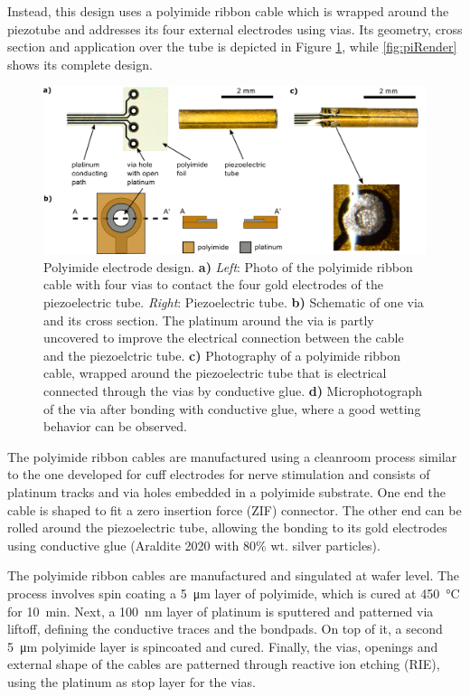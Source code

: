 \documentclass[10pt]{iopart}
\begin{document}
Instead, this design uses a polyimide ribbon cable which is wrapped around the piezotube and addresses its four external electrodes using vias. Its geometry, cross section and application over the tube is depicted in Figure \ref{fig:piRolled}, while \autoref{fig:piRender} shows its complete design.

\begin{figure}[h!]\centering \includegraphics[width=\columnwidth]{figures/tubeFoilH.png}
      \caption{Polyimide electrode design.
      \textbf{a)} \textit{Left}: Photo of the polyimide ribbon cable with four vias to contact the four gold electrodes of the piezoelectric tube. \textit{Right}: Piezoelectric tube.
      \textbf{b)} Schematic of one via and its cross section. The platinum around the via is partly uncovered to improve the electrical connection between the cable and the piezoelctric tube.
      \textbf{c)} Photography of a polyimide ribbon cable, wrapped around the piezoelectric tube that is electrical connected through the vias by conductive glue.
      \textbf{d)} Microphotograph of the via after bonding with conductive glue, where a good wetting behavior can be observed.}
      \label{fig:piRolled}
\end{figure}

The polyimide ribbon cables are manufactured using a cleanroom process similar to the one developed for cuff electrodes for nerve stimulation \cite{Rodriguez2000} and consists of platinum tracks and via holes embedded in a polyimide substrate. One end the cable is shaped to fit a zero insertion force (ZIF) connector. The other end can be rolled around the piezoelectric tube, allowing the bonding to its gold electrodes using conductive glue (Araldite 2020 with 80\% wt. silver particles).

The polyimide ribbon cables are manufactured and singulated at wafer level. The process involves spin coating a \SI{5}{\micro\meter} layer of polyimide, which is cured at \SI{450}{\celsius} for \SI{10}{\minute}. Next, a \SI{100}{\nano\meter} layer of platinum is sputtered and patterned via liftoff, defining the conductive traces and the bondpads. On top of it, a second \SI{5}{\micro\meter} polyimide layer is spincoated and cured. Finally, the vias, openings and external shape of the cables are patterned through reactive ion etching (RIE), using the platinum as stop layer for the vias.
\end{document}
